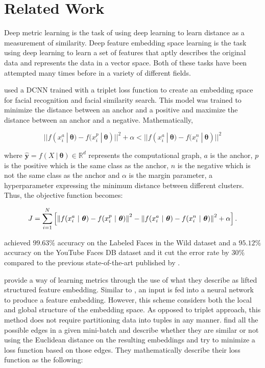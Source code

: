 \chapter{Related Work}
\label{relwork}

Deep metric learning is the task of using deep learning to learn distance as a measurement of similarity. Deep feature embedding space learning is the task using deep learning to learn a set of features that aptly describes the original data and represents the data in a vector space. Both of these tasks have been attempted many times before in a variety of different fields. 

\citet{facenet} used a DCNN trained with a triplet loss function to create an embedding space for facial recognition and facial similarity search. This model was trained to minimize the distance between an anchor and a positive and maximize the distance between an anchor and a negative. Mathematically,

\begin{equation}
  || f(x_{i}^{a} \ | \ \boldsymbol{\theta}) - f(x_{i}^{p} \ | \ \boldsymbol{\theta})||^2 + \alpha < || f(x_i^a \ | \ \boldsymbol{\theta}) - f(x_i^n \ | \ \boldsymbol{\theta}) ||^2
\end{equation}

\noindent
where $ \mathbf{\hat{y}} = f(X \ | \ \boldsymbol{\theta}) \in \mathbb{R}^d $ represents the computational graph, $a$ is the anchor, $p$ is the positive which is the same class as the anchor, $n$ is the negative which is not the same class as the anchor and $ \alpha$ is the margin parameter, a hyperparameter expressing the minimum distance between different clusters. Thus, the objective function becomes:  

\begin{equation}
  J = \sum_{i=1}^{N} \left[
  \norm{f(x_{i}^{a} \ | \ \boldsymbol{\theta}) - f(x_{i}^{p} \ | \ \boldsymbol{\theta})}^2
  - \norm{f(x_i^a \ | \ \boldsymbol{\theta}) - f(x_i^n \ | \ \boldsymbol{\theta}) }^2 + \alpha\right].
\end{equation}

\noindent
\citet{facenet} achieved $99.63\%$ accuracy on the Labeled Faces in the Wild dataset and a $95.12\%$ accuracy on the YouTube Faces DB dataset and it cut the error rate by $30\%$ compared to the previous state-of-the-art published by \citet{sun2014deeply}.

\citet{lifted_structure_embedding} provide a way of learning metrics through the use of what they describe as lifted structured feature embedding. Similar to \citet{facenet}, an input is fed into a neural network to produce a feature embedding. However, this scheme considers both the local and global structure of the embedding space. As opposed to triplet approach, this method does not require partitioning data into tuples in any manner. \citet{lifted_structure_embedding} find all the possible edges in a given mini-batch and describe whether they are similar or not using the Euclidean distance on the resulting embeddings and try to minimize a loss function based on those edges. They mathematically describe their loss function as the following: 

